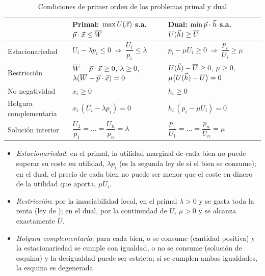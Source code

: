 \documentclass[11pt]{article}
\begin{document}
\begin{table}[H]
\centering\small
\caption{Condiciones de primer orden de los problemas primal y dual}\label{tab:kt}
\renewcommand{\arraystretch}{1.5}
\begin{tabular}{|>{\raggedright\arraybackslash}p{}|>{\centering\arraybackslash}p{}|>{\centering\arraybackslash}p{}|}
\hline
\rowcolor{tceeazulpalido} & \textbf{Primal: $\max U(\vec{x})$ s.a. $\vec{p}\cdot\vec{x}\leq\overline{W}$} & \textbf{Dual: $\min \vec{p}\cdot\vec{h}$ s.a. $U(\vec{h})\geq\overline{U}$}\\
\hline
Estacionariedad & $U_i-\lambda p_i\leq 0\ \Rightarrow\ \dfrac{U_i}{p_i}\leq\lambda$ & $p_i-\mu U_i\geq 0\ \Rightarrow\ \dfrac{p_i}{U_i}\geq\mu$\\[6pt]
\hline
Restricción & $\overline{W}-\vec{p}\cdot\vec{x}\geq 0$, $\lambda\geq 0$, $\lambda(\overline{W}-\vec{p}\cdot\vec{x})=0$ & $U(\vec{h})-\overline{U}\geq 0$, $\mu\geq 0$, $\mu\big(U(\vec{h})-\overline{U}\big)=0$\\
\hline
No negatividad & $x_i\geq 0$ & $h_i\geq 0$\\
\hline
Holgura complementaria & $x_i\,(U_i-\lambda p_i)=0$ & $h_i\,(p_i-\mu U_i)=0$\\
\hline
Solución interior & $\dfrac{U_1}{p_1}=\dots=\dfrac{U_n}{p_n}=\lambda$ & $\dfrac{p_1}{U_1}=\dots=\dfrac{p_n}{U_n}=\mu$\\[6pt]
\hline
\end{tabular}
\par{}
\end{table}

\begin{itemize}
\item \emph{Estacionariedad}: en el primal, la utilidad marginal de cada bien no puede superar su coste en utilidad, $\lambda p_i$ (es la segunda ley de  si el bien se consume); en el dual, el precio de cada bien no puede ser menor que el coste en dinero de la utilidad que aporta, $\mu U_i$.
\item \emph{Restricción}: por la insaciabilidad local, en el primal $\lambda>0$ y se gasta toda la renta (ley de ); en el dual, por la continuidad de $U$, $\mu>0$ y se alcanza exactamente $\overline{U}$.
\item \emph{Holgura complementaria}: para cada bien, o se consume (cantidad positiva) y la estacionariedad se cumple con igualdad, o no se consume (solución de esquina) y la desigualdad puede ser estricta; si se cumplen ambas igualdades, la esquina es degenerada.
\end{itemize}
\end{document}
